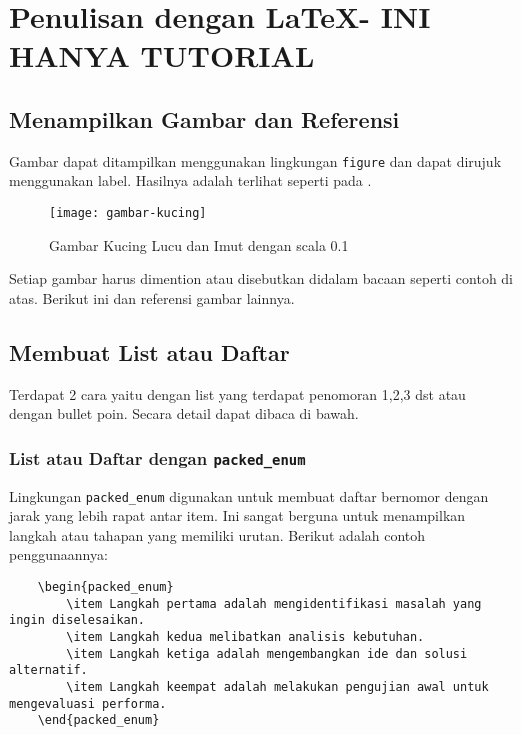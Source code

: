 \chapter[Penulisan dengan \LaTeX - INI HANYA TUTORIAL]{Penulisan dengan \LaTeX - INI HANYA TUTORIAL}

\section{Menampilkan Gambar dan Referensi}
Gambar dapat ditampilkan menggunakan lingkungan \texttt{figure} dan dapat dirujuk menggunakan label. Hasilnya adalah terlihat seperti pada .

\begin{figure}[H]
    \centering
    \texttt{[image: gambar-kucing]}
    \caption{Gambar Kucing Lucu dan Imut dengan scala 0.1}
    \label{fig:kucing-example}
\end{figure}

Setiap gambar harus dimention atau disebutkan didalam bacaan seperti contoh di atas. Berikut ini  dan referensi gambar lainnya.

\section{Membuat List atau Daftar}
Terdapat 2 cara yaitu dengan list yang terdapat penomoran 1,2,3 dst atau dengan bullet poin. Secara detail dapat dibaca di bawah.
\subsection{List atau Daftar dengan \texttt{packed\_enum}}
Lingkungan \texttt{packed\_enum} digunakan untuk membuat daftar bernomor dengan jarak yang lebih rapat antar item. Ini sangat berguna untuk menampilkan langkah atau tahapan yang memiliki urutan. Berikut adalah contoh penggunaannya:

\begin{lstlisting}
    \begin{packed_enum}
        \item Langkah pertama adalah mengidentifikasi masalah yang ingin diselesaikan.
        \item Langkah kedua melibatkan analisis kebutuhan.
        \item Langkah ketiga adalah mengembangkan ide dan solusi alternatif.
        \item Langkah keempat adalah melakukan pengujian awal untuk mengevaluasi performa.
    \end{packed_enum}
\end{lstlisting}
    
